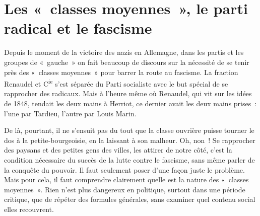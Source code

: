 \documentclass[french,twoside]{book} %
\begin{document}
\section[{Les « classes moyennes », le parti radical et le fascisme}]{Les « classes moyennes », le parti radical et le fascisme}
\noindent Depuis le moment de la victoire des nazis en Allemagne, dans les partis et les groupes de « gauche » on fait beaucoup de discours sur la nécessité de se tenir près des « classes moyennes » pour barrer la route au fascisme. La fraction Renaudel et C\textsuperscript{ie} s’est séparée du Parti socialiste avec le but spécial de se rapprocher des radicaux. Mais à l’heure même où Renaudel, qui vit sur les idées de 1848, tendait les deux mains à Herriot, ce dernier avait les deux mains prises : l’une par Tardieu, l’autre par Louis Marin.\par
De là, pourtant, il ne s’ensuit pas du tout que la classe ouvrière puisse tourner le dos à la petite-bourgeoisie, en la laissant à son malheur. Oh, non ! Se rapprocher des paysans et des petites gens des villes, les attirer de notre côté, c’est la condition nécessaire du succès de la lutte contre le fascisme, sans même parler de la conquête du pouvoir. Il faut seulement poser d’une façon juste le problème. Mais pour cela, il faut comprendre clairement quelle est la nature des « classes moyennes ». Rien n’est plus dangereux en politique, surtout dans une période critique, que de répéter des formules générales, sans examiner quel contenu social elles recouvrent.\par
\end{document}

